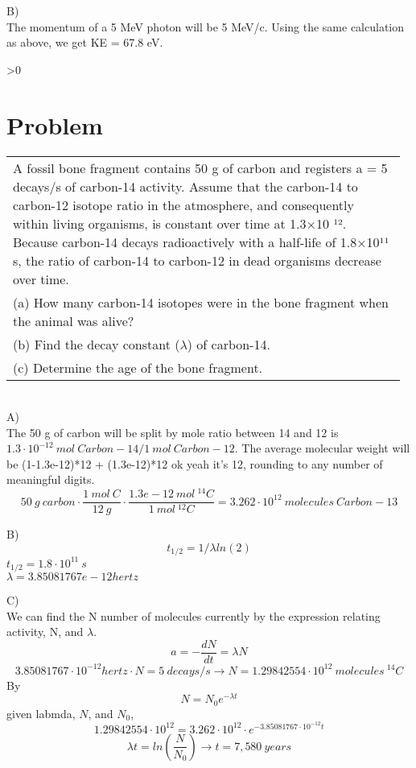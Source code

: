 \documentclass{article}
\newcounter{problemnumber}\setcounter{problemnumber}{1}
\newcommand{\problem}[1][-1]{
    \setcounter{partnumber}{1}
    \ifnum#1>0
        \setcounter{problemnumber}{#1}
    \fi
    \section*{Problem \arabic{problemnumber}}
    \stepcounter{problemnumber}
}
\newcounter{partnumber}\setcounter{partnumber}{1}
\newenvironment{question}{
    \color{gray}\itshape
    \vspace{5pt}
    \begin{tabular}{|p{0.97\linewidth}}
}{
    \end{tabular}\\[5pt]
}
\begin{document}
B) \\
The momentum of a 5 MeV photon will be 5 MeV/c. Using the same calculation as above, we get KE = 67.8 eV.

\newpage
\problem
\begin{question}
	A fossil bone fragment contains 50 g of carbon and registers a = 5 decays/s of carbon-14 activity.
Assume that the carbon-14 to carbon-12 isotope ratio in the atmosphere, and consequently within
living organisms, is constant over time at 1.3×10 ¹². Because carbon-14 decays radioactively with a
half-life of 1.8×10¹¹ s, the ratio of carbon-14 to carbon-12 in dead organisms decrease over time.\\
(a) How many carbon-14 isotopes were in the bone fragment when the animal was alive?\\
(b) Find the decay constant ($\lambda$) of carbon-14.\\
(c) Determine the age of the bone fragment. 
\end{question}
A)\\
The 50 g of carbon will be split by mole ratio between 14 and 12 is $1.3 \cdot 10^{-12}\ mol\ Carbon-14/1\ mol\ Carbon-12$. The average molecular weight will be (1-1.3e-12)*12 + (1.3e-12)*12 ok yeah it's 12, rounding to any number of meaningful digits.
$$ 50\ g\ carbon \cdot \frac{1\ mol\ C}{12\ g} \cdot \frac{1.3e-12\ mol\ ^{14}C}{1\ mol\ ^{12}C} = 3.262 \cdot 10^{12}\ molecules\ Carbon-13 $$

B)\\
$$t_{1/2} = 1/\lambda ln(2) $$
$t_{1/2} = 1.8 \cdot 10^{11}\ s$\\
$\lambda = 3.85081767e-12 hertz$

C)\\
We can find the N number of molecules currently by the expression relating activity, N, and $\lambda$.
$$ a = -\frac{dN}{dt} = \lambda N $$
$$ 3.85081767 \cdot 10^{-12} hertz \cdot N = 5\ decays/s \rightarrow N = 1.29842554 \cdot 10^{12}\ molecules\ ^{14}C $$
By
$$ N = N_0e^{-\lambda t} $$
given labmda, $N$, and $N_0$,
$$ 1.29842554 \cdot 10^{12} = 3.262 \cdot 10^{12}\cdot e^{-3.85081767 \cdot 10^{-12} t} $$
$$ \lambda t = ln \left(\frac{N}{N_0} \right) \rightarrow t = 7,580\ years $$
\end{document}
